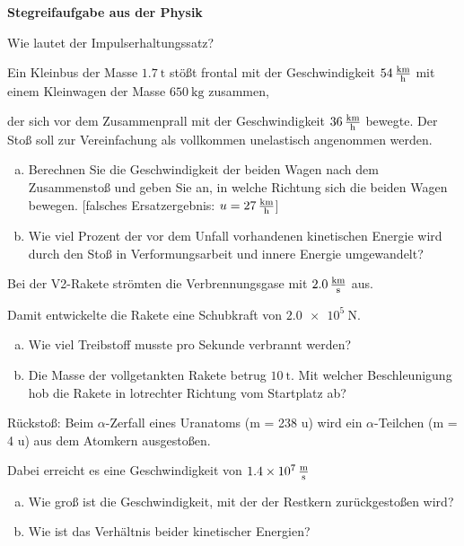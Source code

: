 \documentclass[a4paper]{article}
\begin{document}
{\bf Stegreifaufgabe aus der Physik }\\
\begin{enumerate}[1.]
{\bf \item Wie lautet der Impulserhaltungssatz?}
{\bf \item Ein Kleinbus der Masse $\SI{1,7}{\tonne}$ stößt frontal mit der Geschwindigkeit  $\SI{54}{\kilo\meter\over \hour}$  mit einem Kleinwagen der Masse $\SI{650}{\kilogram}$ zusammen,} der sich vor dem Zusammenprall mit der Geschwindigkeit  $\SI{36}{\kilo\meter\over \hour}$  bewegte. Der Stoß soll zur Vereinfachung als vollkommen unelastisch angenommen werden.

\begin{enumerate}[a)]
\item Berechnen Sie die Geschwindigkeit der beiden Wagen nach dem Zusammenstoß und geben Sie an, in welche Richtung sich die beiden Wagen bewegen. [falsches Ersatzergebnis: $ u= \SI{27}{\kilo\meter\over \hour}$]
\item Wie viel Prozent der vor dem Unfall vorhandenen kinetischen Energie wird durch den Stoß in 
Verformungsarbeit und innere Energie umgewandelt? 
\end{enumerate}

{\bf \item Bei der V2-Rakete strömten die Verbrennungsgase mit $\SI{2,0}{\kilo\meter\over \second}$ aus.} Damit entwickelte die Rakete eine Schubkraft von $\SI{2,0e5}{\newton}$.

\begin{enumerate}[a)]
\item Wie viel Treibstoff musste pro Sekunde verbrannt werden?
\item Die Masse der vollgetankten Rakete betrug $\SI{10}{\tonne}$. Mit welcher Beschleunigung hob die Rakete in lotrechter Richtung vom Startplatz ab?
\end{enumerate} 

{\bf \item Rückstoß: Beim $\alpha$-Zerfall eines Uranatoms (m = 238 u) wird ein $\alpha$-Teilchen (m = 4 u) aus dem Atomkern ausgestoßen.}
	Dabei erreicht es eine Geschwindigkeit von $\SI{1,4e7}{\meter\over \second}$
	\begin{enumerate}[a)]
		\item	Wie groß ist die Geschwindigkeit, mit der der Restkern zurückgestoßen wird?
		\item Wie ist das Verhältnis beider kinetischer Energien?
	\end{enumerate}
 

\end{enumerate}
\end{document}
